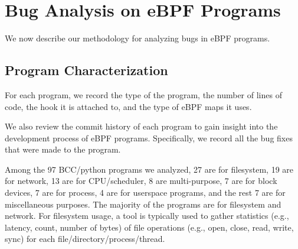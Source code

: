 \section{Bug Analysis on eBPF Programs}


We now describe our methodology for analyzing bugs in eBPF programs.



\subsection{Program Characterization}
For each program, we record the type of the program, the number of lines of code, the hook it is attached to, and the type of eBPF maps it uses.

We also review the commit history of each program to gain insight into the development process of eBPF programs. Specifically, we record all the bug fixes that were made to the program.

Among the 97 BCC/python programs we analyzed, 27 are for filesystem, 19 are for network, 13 are for CPU/scheduler, 8 are multi-purpose, 7 are for block devices, 7 are for process, 4 are for userspace programs, and the rest 7 are for miscellaneous purposes.
The majority of the programs are for filesystem and network.
For filesystem usage, a tool is typically used to gather statistics (e.g., latency, count, number of bytes) of file operations (e.g., open, close, read, write, sync) for each file/directory/process/thread.


